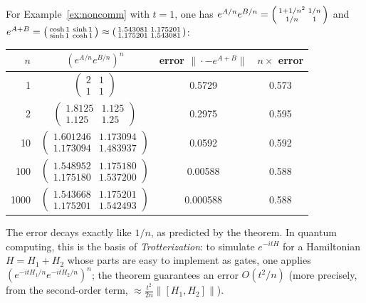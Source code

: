 \documentclass[11pt,a4paper]{article}
\numberwithin{equation}{section}
\theoremstyle{plain}
\theoremstyle{definition}
\theoremstyle{plain}
\theoremstyle{definition}
\begin{document}
\begin{addition}
For Example~\ref{ex:noncomm} with $t=1$, one has
$e^{A/n}e^{B/n}=\begin{psmallmatrix}1+1/n^2&1/n\\1/n&1\end{psmallmatrix}$ and
$e^{A+B}=\begin{psmallmatrix}\cosh1&\sinh1\\\sinh1&\cosh1\end{psmallmatrix}
\approx\begin{psmallmatrix}1.543081&1.175201\\1.175201&1.543081\end{psmallmatrix}$:
\begin{center}\footnotesize\renewcommand{\arraystretch}{1.1}
\begin{tabular}{rccc}
\toprule
$n$ & $(e^{A/n}e^{B/n})^n$ & error $\|\cdot-e^{A+B}\|$ & $n\times$ error\\
\midrule
1 & $\begin{pmatrix}2&1\\1&1\end{pmatrix}$ & 0.5729 & 0.573\\
2 & $\begin{pmatrix}1.8125&1.125\\1.125&1.25\end{pmatrix}$ & 0.2975 & 0.595\\
10 & $\begin{pmatrix}1.601246&1.173094\\1.173094&1.483937\end{pmatrix}$ & 0.0592 & 0.592\\
100 & $\begin{pmatrix}1.548952&1.175180\\1.175180&1.537200\end{pmatrix}$ & 0.00588 & 0.588\\
1000 & $\begin{pmatrix}1.543668&1.175201\\1.175201&1.542493\end{pmatrix}$ & 0.000588 & 0.588\\
\bottomrule
\end{tabular}
\end{center}
The error decays exactly like $1/n$, as predicted by the theorem. In quantum computing, this
is the basis of \emph{Trotterization}: to simulate $e^{-itH}$ for a Hamiltonian
$H=H_1+H_2$ whose parts are easy to implement as gates, one applies
$(e^{-itH_1/n}e^{-itH_2/n})^n$; the theorem guarantees an error $O(t^2/n)$ (more precisely,
from the second-order term, $\approx\frac{t^2}{2n}\|[H_1,H_2]\|$).
\end{addition}
\end{document}

